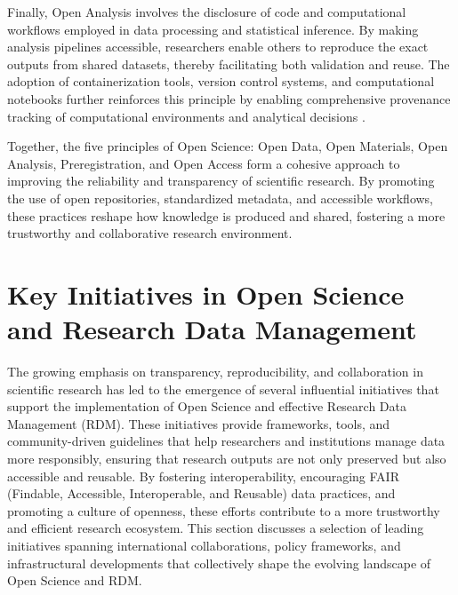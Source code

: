 \documentclass[final]{rc-book-2.14}
\begin{document}
Finally, Open Analysis involves the disclosure of code and computational workflows employed in data processing and statistical inference. By making analysis pipelines accessible, researchers enable others to reproduce the exact outputs from shared datasets, thereby facilitating both validation and reuse. The adoption of containerization tools, version control systems, and computational notebooks further reinforces this principle by enabling comprehensive provenance tracking of computational environments and analytical decisions \cite{van_dijk_open_2021, samuel_understanding_2021}.

Together, the five principles of Open Science: Open Data, Open Materials, Open Analysis, Preregistration, and Open Access form a cohesive approach to improving the reliability and transparency of scientific research. By promoting the use of open repositories, standardized metadata, and accessible workflows, these practices reshape how knowledge is produced and shared, fostering a more trustworthy and collaborative research environment.

\section{Key Initiatives in Open Science and Research Data Management}

The growing emphasis on transparency, reproducibility, and collaboration in scientific research has led to the emergence of several influential initiatives that support the implementation of Open Science and effective Research Data Management (RDM). These initiatives provide frameworks, tools, and community-driven guidelines that help researchers and institutions manage data more responsibly, ensuring that research outputs are not only preserved but also accessible and reusable. By fostering interoperability, encouraging FAIR (Findable, Accessible, Interoperable, and Reusable) data practices, and promoting a culture of openness, these efforts contribute to a more trustworthy and efficient research ecosystem. This section discusses a selection of leading initiatives spanning international collaborations, policy frameworks, and infrastructural developments that collectively shape the evolving landscape of Open Science and RDM.
\end{document}
